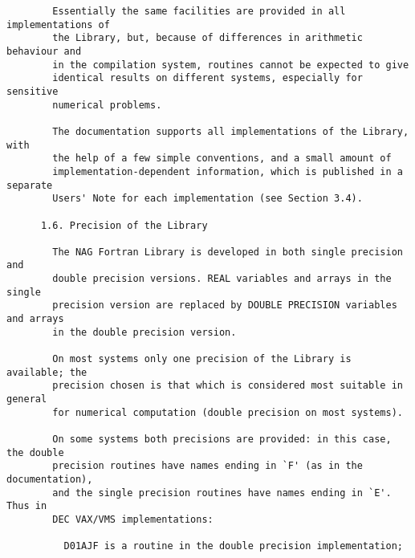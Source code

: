 \begin{small}
\begin{verbatim}
        Essentially the same facilities are provided in all implementations of    
        the Library, but, because of differences in arithmetic behaviour and      
        in the compilation system, routines cannot be expected to give            
        identical results on different systems, especially for sensitive          
        numerical problems.                                                       
                                                                                  
        The documentation supports all implementations of the Library, with       
        the help of a few simple conventions, and a small amount of               
        implementation-dependent information, which is published in a separate    
        Users' Note for each implementation (see Section 3.4).                    
                                                                                  
      1.6. Precision of the Library                                               
                                                                                  
        The NAG Fortran Library is developed in both single precision and         
        double precision versions. REAL variables and arrays in the single        
        precision version are replaced by DOUBLE PRECISION variables and arrays   
        in the double precision version.                                          
                                                                                  
        On most systems only one precision of the Library is available; the       
        precision chosen is that which is considered most suitable in general     
        for numerical computation (double precision on most systems).             
                                                                                  
        On some systems both precisions are provided: in this case, the double    
        precision routines have names ending in `F' (as in the documentation),    
        and the single precision routines have names ending in `E'. Thus in       
        DEC VAX/VMS implementations:                                              
                                                                                  
          D01AJF is a routine in the double precision implementation;             
                                                                                  

\end{verbatim}
\end{small}
